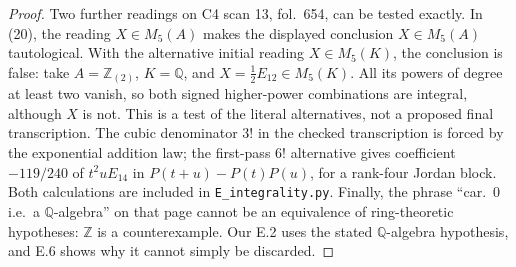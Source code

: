 \begin{proof}
Two further readings on C4 scan 13, fol.~654, can be tested exactly.
In (20), the reading \(X\in M_5(A)\) makes the displayed conclusion
\(X\in M_5(A)\) tautological.  With the alternative initial reading
\(X\in M_5(K)\), the conclusion is false: take
\(A=\mathbb Z_{(2)}\), \(K=\mathbb Q\), and
\(X=\tfrac12E_{12}\in M_5(K)\).  All its powers of degree at least
two vanish, so both signed higher-power combinations are integral,
although \(X\) is not.  This is a test of the literal alternatives,
not a proposed final transcription.  The cubic denominator \(3!\)
in the checked transcription is forced by the exponential addition
law; the first-pass \(6!\) alternative gives coefficient
\(-119/240\) of \(t^2uE_{14}\) in
\(P(t+u)-P(t)P(u)\), for a rank-four Jordan block.  Both calculations
are included in \texttt{E\_integrality.py}.  Finally, the phrase
``car.~0 i.e.\ a \(\mathbb Q\)-algebra'' on that page cannot be
an equivalence of ring-theoretic hypotheses: \(\mathbb Z\) is a
counterexample.  Our E.2 uses the stated \(\mathbb Q\)-algebra
hypothesis, and E.6 shows why it cannot simply be discarded.
\end{proof}

